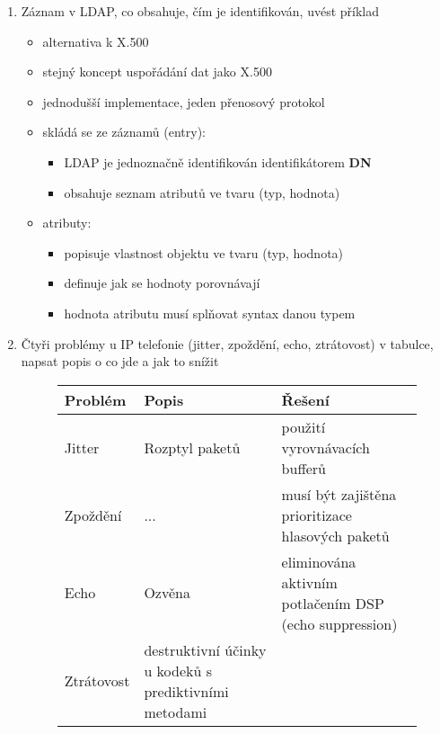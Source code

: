 \documentclass[12pt,a4paper,titlepage,final]{article}
\begin{document}
\begin{enumerate}
	\item Záznam v LDAP, co obsahuje, čím je identifikován, uvést příklad
	\begin{itemize}
		\item alternativa k X.500
		\item stejný koncept uspořádání dat jako X.500
		\item jednodušší implementace, jeden přenosový protokol
	    \item skládá se ze záznamů (entry):
	    \begin{itemize}
	        \item LDAP je jednoznačně identifikován identifikátorem \textbf{DN} 	
		    \item obsahuje seznam atributů ve tvaru (typ, hodnota)
		\end{itemize}
		\item atributy:
		\begin{itemize}
			\item popisuje vlastnost objektu ve tvaru (typ, hodnota)
			\item definuje jak se hodnoty porovnávají
			\item hodnota atributu musí splňovat syntax danou typem	
		\end{itemize}
	\end{itemize}

	\item Čtyři problémy u IP telefonie (jitter, zpoždění, echo, ztrátovost) v tabulce, napsat popis o co jde a jak to snížit
	\begin{figure}[h!]
	\centering
	\begin{tabular}{| l | p{5cm} | p{5cm} |}
		\hline
		\textbf{Problém} & \textbf{Popis} & \textbf{Řešení} \\ \hline \hline
		Jitter & Rozptyl paketů & použití vyrovnávacích bufferů \\ \hline
		Zpoždění & ... & musí být zajištěna prioritizace hlasových paketů \\ \hline
		Echo & Ozvěna & eliminována aktivním potlačením DSP (echo suppression) \\ \hline
		Ztrátovost & destruktivní účinky u kodeků s prediktivními metodami & \\ \hline
	\end{tabular}
	\end{figure}


\end{enumerate}
\end{document}
